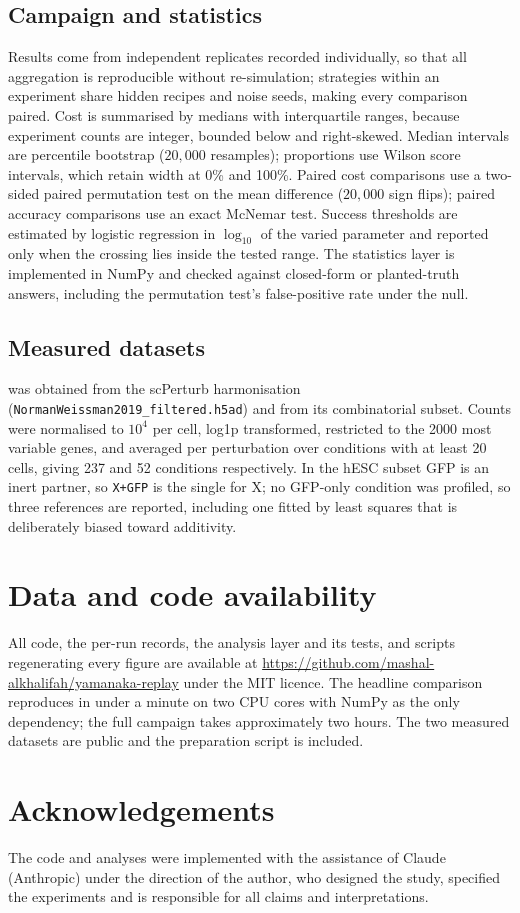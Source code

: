\documentclass[11pt]{article}
\begin{document}
\subsection{Campaign and statistics}

Results come from independent replicates recorded individually, so that all
aggregation is reproducible without re-simulation; strategies within an
experiment share hidden recipes and noise seeds, making every comparison paired.
Cost is summarised by medians with interquartile ranges, because experiment
counts are integer, bounded below and right-skewed. Median intervals are
percentile bootstrap ($20{,}000$ resamples); proportions use Wilson score
intervals, which retain width at 0\% and 100\%. Paired cost comparisons use a
two-sided paired permutation test on the mean difference ($20{,}000$ sign
flips); paired accuracy comparisons use an exact McNemar test. Success
thresholds are estimated by logistic regression in $\log_{10}$ of the varied
parameter and reported only when the crossing lies inside the tested range. The
statistics layer is implemented in NumPy and checked against closed-form or
planted-truth answers, including the permutation test's false-positive rate
under the null.

\subsection{Measured datasets}

\citet{norman2019} was obtained from the scPerturb harmonisation
\citep{peidli2024} (\texttt{NormanWeissman2019\_}\allowbreak\texttt{filtered.h5ad}) and
\citet{joung2023} from its combinatorial subset. Counts were normalised to $10^4$ per cell, log1p
transformed, restricted to the 2000 most variable genes, and averaged per
perturbation over conditions with at least 20 cells, giving 237 and 52
conditions respectively. In the hESC subset GFP is an inert partner, so
\texttt{X+GFP} is the single for X; no GFP-only condition was profiled, so three
references are reported, including one fitted by least squares that is
deliberately biased toward additivity.

\section*{Data and code availability}

All code, the per-run records, the analysis layer and its tests, and scripts
regenerating every figure are available at
\url{https://github.com/mashal-alkhalifah/yamanaka-replay} under the MIT licence. The
headline comparison reproduces in under a minute on two CPU cores with NumPy as
the only dependency; the full campaign takes approximately two hours. The two
measured datasets are public and the preparation script is included.

\section*{Acknowledgements}

The code and analyses were implemented with the assistance of Claude
(Anthropic) under the direction of the author, who designed the study, specified
the experiments and is responsible for all claims and interpretations.



\end{document}
